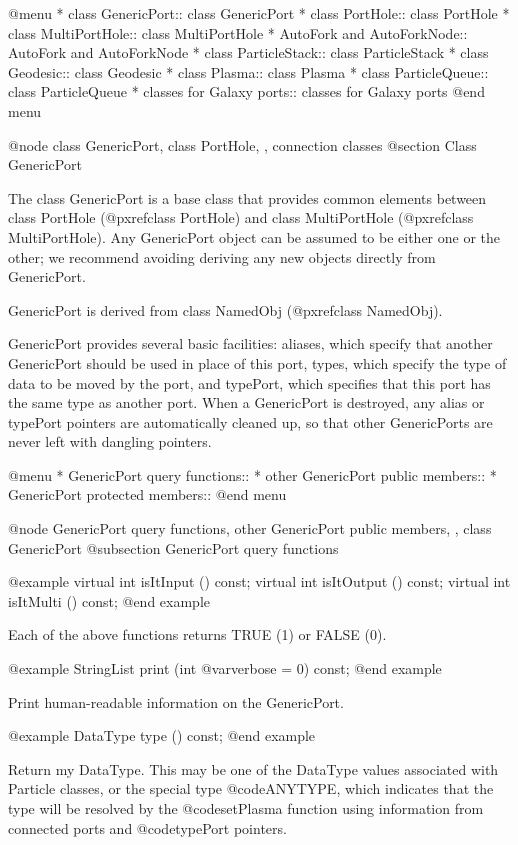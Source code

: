 @menu
* class GenericPort::  class GenericPort
* class PortHole::  class PortHole
* class MultiPortHole::  class MultiPortHole
* AutoFork and AutoForkNode::  AutoFork and AutoForkNode
* class ParticleStack::  class ParticleStack
* class Geodesic::  class Geodesic
* class Plasma::    class Plasma
* class ParticleQueue::  class ParticleQueue
* classes for Galaxy ports::  classes for Galaxy ports
@end menu

@node class GenericPort, class PortHole,  , connection classes
@section Class GenericPort

The class GenericPort is a base class that provides common elements
between class PortHole (@pxref{class PortHole})
and class MultiPortHole (@pxref{class MultiPortHole}).
Any GenericPort object
can be assumed to be either one or the other; we recommend avoiding
deriving any new objects directly from GenericPort.

GenericPort is derived from class NamedObj (@pxref{class NamedObj}).

GenericPort provides several basic facilities: aliases, which specify
that another GenericPort should be used in place of this port, types,
which specify the type of data to be moved by the port, and typePort,
which specifies that this port has the same type as another port.
When a GenericPort is destroyed, any alias or typePort pointers are
automatically cleaned up, so that other GenericPorts are never left
with dangling pointers.

@menu
* GenericPort query functions::  
* other GenericPort public members::  
* GenericPort protected members::  
@end menu

@node GenericPort query functions, other GenericPort public members,  , class GenericPort
@subsection GenericPort query functions

@example
virtual int isItInput () const;
virtual int isItOutput () const;
virtual int isItMulti () const;
@end example

Each of the above functions returns TRUE (1) or FALSE (0).

@example
StringList print (int @var{verbose} = 0) const;
@end example

Print human-readable information on the GenericPort.

@example
DataType type () const;
@end example

Return my DataType.  This may be one of the DataType values associated
with Particle classes, or the special type @code{ANYTYPE}, which
indicates that the type will be resolved by the @code{setPlasma}
function using information from connected ports and @code{typePort} pointers.

